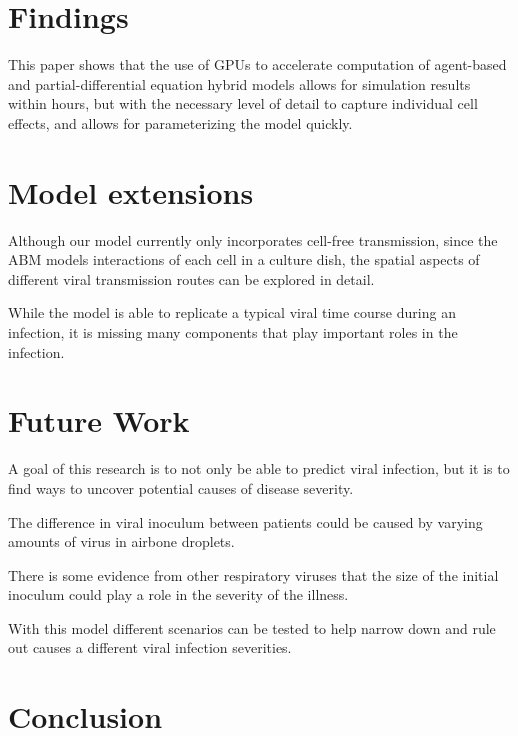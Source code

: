 
\section{Findings}

This paper shows that the use of GPUs to accelerate computation of agent-based and partial-differential equation hybrid models allows for simulation results within hours, but with the necessary level of detail to capture individual cell effects, and allows for parameterizing the model quickly. 

\section{Model extensions}

Although our model currently only incorporates cell-free transmission, since the ABM models interactions of each cell in a culture dish, the spatial aspects of different viral transmission routes can be explored in detail. 

While the model is able to replicate a typical viral time course during an infection, it is missing many components that play important roles in the infection. 


\section{Future Work}

A goal of this research is to not only be able to predict viral infection, but it is to find ways to uncover potential causes of disease severity. 

The difference in viral inoculum between patients could be caused by varying amounts of virus in airbone droplets. 

There is some evidence from other respiratory viruses that the size of the initial inoculum could play a role in the severity of the illness. 

With this model different scenarios can be tested to help narrow down and rule out causes a different viral infection severities. 

\section{Conclusion}

